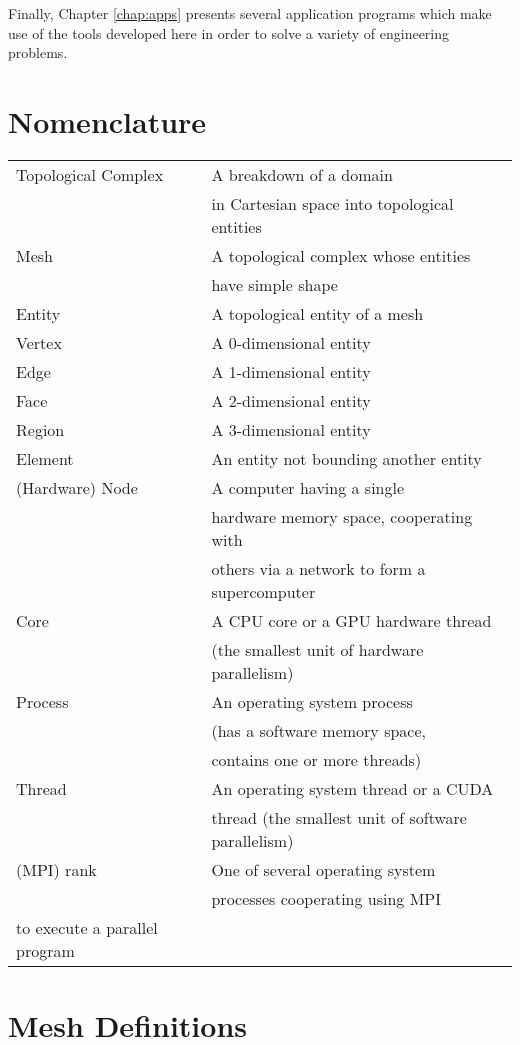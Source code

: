 Finally, Chapter \ref{chap:apps} presents several
application programs which make use of the tools developed
here in order to solve a variety of engineering problems.

\section{Nomenclature}

\begin{tabular}{l|l}
Topological Complex & A breakdown of a domain \\
 & in Cartesian space into topological entities \\
Mesh & A topological complex whose entities \\
 & have simple shape \\
Entity & A topological entity of a mesh \\
Vertex & A 0-dimensional entity \\
Edge & A 1-dimensional entity \\
Face & A 2-dimensional entity \\
Region & A 3-dimensional entity \\
Element & An entity not bounding another entity \\
(Hardware) Node & A computer having a single \\
 & hardware memory space, cooperating with \\
 & others via a network to form a supercomputer \\
Core & A CPU core or a GPU hardware thread \\
 & (the smallest unit of hardware parallelism) \\
Process & An operating system process \\
 & (has a software memory space, \\
 & contains one or more threads) \\
Thread & An operating system thread or a CUDA \\
 & thread (the smallest unit of software parallelism) \\
(MPI) rank & One of several operating system \\
 & processes cooperating using MPI \\
to execute a parallel program \\
\end{tabular}

\section{Mesh Definitions}

